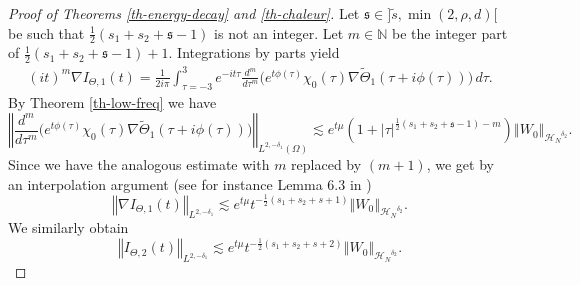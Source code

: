 \documentclass[10pt, a4paper,reqno]{amsart}
\theoremstyle{plain}
\theoremstyle{definition}
\theoremstyle{remark}
\begin{document}
\begin{proof}[Proof of Theorems \ref{th-energy-decay} and \ref{th-chaleur}]
{\noindent {\bf $\bullet$}\quad } Let $\mathfrak s \in ]\tilde s,\min(2,\rho,d)[$ be such that $\frac 12 (s_1 + s_2 + \mathfrak s -1)$ is not an integer. Let $m \in {\mathbb{N}}$ be the integer part of $\frac 12 (s_1 + s_2 + \mathfrak s - 1) + 1$. Integrations by parts yield
\begin{align*}
(it)^m \nabla I_{{\Theta},1}(t) = \frac 1 {2i\pi} \int_{{\tau} = -3}^3 e^{-it{\tau}} \frac {d^m}{d{\tau}^m} \big(e^{t {\phi}({\tau})} {\chi}_0({\tau})\nabla \tilde {\Theta}_1({\tau} + i {\phi}({\tau})) \big)\, d{\tau}.
\end{align*}
By Theorem \ref{th-low-freq} we have 
\[
{\left\Vert {\frac {d^m}{d{\tau}^m} \big(e^{t {\phi}({\tau})} {\chi}_0({\tau})  \nabla \tilde {\Theta}_1({\tau} + i {\phi}({\tau})) \big)}\right\Vert}_{L^{2,-{\delta}_1}({\Omega})} \lesssim e^{t{\mu}} \left( 1 + {\left\vert {\tau}\right\vert}^{\frac 12 (s_1 + s_2 + \mathfrak s - 1) - m} \right) {\left\Vert {W_0}\right\Vert}_{{\mathcal H_N}^{{\delta}_2}}.
\]
Since we have the analogous estimate with $m$ replaced by $(m+1)$, we get by an interpolation argument (see for instance Lemma 6.3 in \cite{KhenissiRo})
\begin{equation} \label{estim-ITh1}
{\left\Vert {\nabla I_{{\Theta},1}(t)}\right\Vert}_{L^{2,-{\delta}_1}}  \lesssim e^{t{\mu}}  t^{-\frac 12 (s_1 + s_2 + s + 1)} {\left\Vert {W_0}\right\Vert}_{{\mathcal H_N}^{{\delta}_2}}.
\end{equation}
We similarly obtain 
\begin{equation} \label{estim-ITh2}
{\left\Vert {I_{{\Theta},2}(t)}\right\Vert}_{L^{2,-{\delta}_1}}  \lesssim e^{t{\mu}}  t^{-\frac 12 (s_1 + s_2 + s + 2)} {\left\Vert {W_0}\right\Vert}_{{\mathcal H_N}^{{\delta}_2}}.
\end{equation}


\end{proof}
\end{document}
